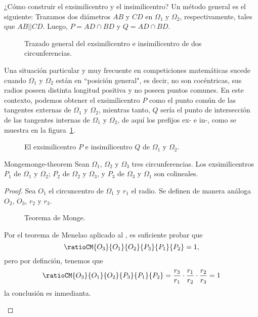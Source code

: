 ¿Cómo construir el exsimilicentro y el insimilicentro?
Un método general es el siguiente: Trazamos dos diámetros $AB$ y $CD$ en $\Omega_1$ y $\Omega_2$, respectivamente, tales que $AB || CD$.
Luego, $P = AD \cap BD$ y $Q = AD \cap BD$.

\begin{figure}[H]
    \centering
    
    \caption{Trazado general del exsimilicentro e insimilicentro de dos circunferencias.}
\end{figure}

Una situación particular y muy frecuente en competiciones matemáticas sucede cuando $\Omega_1$ y $\Omega_2$ están en ``posición general", es decir, no son cocéntricas, sus radios poseen distinta longitud positiva y no poseen puntos comunes.
En este contexto, podemos obtener el exsimilicentro $P$ como el punto común de las tangentes externas de $\Omega_1$ y $\Omega_2$, mientras tanto, $Q$ sería el punto de intersección de las tangentes internas de $\Omega_1$ y $\Omega_2$, de aquí los prefijos ex- e in-, como se muestra en la figura~\ref{fig:ex-in-similaricenter}.

\begin{figure}[H]
    \centering
    
    \caption{El exsimilicentro $P$ e insimilicentro $Q$ de $\Omega_1$ y $\Omega_2$.}
    \label{fig:ex-in-similaricenter}
\end{figure}

\begin{section-theorem.tcb}{Monge}{monge-theorem}
    Sean $\Omega_1$, $\Omega_2$ y $\Omega_3$ tres circunferencias.
    Los exsimilicentros $P_1$ de $\Omega_1$ y $\Omega_2$; $P_2$ de $\Omega_2$ y $\Omega_3$, y $P_3$ de $\Omega_3$ y $\Omega_1$ son colineales.
\end{section-theorem.tcb}

\begin{proof}
    Sea $O_1$ el circuncentro de $\Omega_1$ y $r_1$ el radio.
    Se definen de manera análoga $O_2$, $O_3$, $r_2$ y $r_3$.
    \begin{multicols}{2}
        \begin{figure}[H]
            \centering
            
            \caption{Teorema de Monge.}
        \end{figure}
        Por el teorema de Menelao aplicado al , es suficiente probar que
        \[
            \ratioCM{O_3}{O_1}{O_2}{P_3}{P_1}{P_2} = 1,
        \]
        pero por definción, tenemos que
        \[
            \ratioCM{O_3}{O_1}{O_2}{P_3}{P_1}{P_2} = \dfrac{r_3}{r_1} \cdot \dfrac{r_1}{r_2} \cdot \dfrac{r_2}{r_3} = 1
        \]
        la conclusión es inmedianta. \qedhere
    \end{multicols}
\end{proof}


